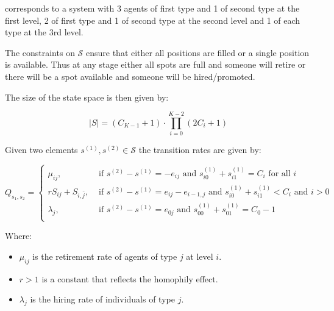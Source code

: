 \documentclass{article}
\renewcommand{\S}{\mathcal{S}}
\begin{document}
corresponds to a system with 3 agents of first type and 1 of second type at the
first level, 2 of first type and 1 of second type at the second level and 1 of
each type at the 3rd level.

The constraints on \(\S\) ensure that either all positions are filled or a
single position is available. Thus at any stage either all spots are full and
someone will retire or there will be a spot available and someone will be
hired/promoted.

The size of the state space is then given by:

\begin{equation}
    |S| = (C_{K - 1} + 1)\cdot \prod_{i=0}^{K - 2}\left(2C_i + 1\right)
\end{equation}

Given two elements \(s^{(1)}, s^{(2)}\in \S\) the transition rates are given by:

\begin{equation}\label{eqn:transition_rates}
    Q_{s_1, s_2} =
        \begin{cases}
            \mu_{ij},& \text{ if }s^{(2)} - s^{(1)} = -e_{ij}
            \text{ and }s^{(1)}_{i0} + s^{(1)}_{i1} = C_i\text{ for all }i\\
           rS_{ij} + S_{i, \bar j},& \text{ if }s^{(2)} - s^{(1)} = e_{ij} - e_{i-1, j}
                                     \text{ and }s^{(1)}_{i0} + s^{(1)}_{i1} < C_{i}
                                     \text{ and }i > 0\\
           \lambda_{j},&\text{ if }s^{(2)} - s^{(1)} = e_{0j}
                        \text{ and }s^{(1)}_{00} + s^{(1)}_{01} = C_{0} - 1\\
        \end{cases}
\end{equation}

Where:

\begin{itemize}
    \item \(\mu_{ij}\) is the retirement rate of agents of type \(j\) at level
        \(i\).
    \item \(r > 1\) is a constant that reflects the homophily effect.
    \item \(\lambda_j\) is the hiring rate of individuals of type \(j\).
\end{itemize}

\end{document}

